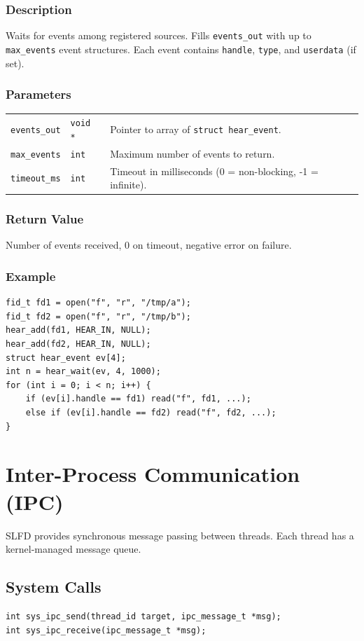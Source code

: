 \documentclass[12pt,a4paper]{article}
\begin{document}
\subsubsection{Description}
Waits for events among registered sources. Fills \texttt{events\_out} with up to \texttt{max\_events} event structures. Each event contains \texttt{handle}, \texttt{type}, and \texttt{userdata} (if set).

\subsubsection{Parameters}
\begin{tabularx}{\textwidth}{|l|l|X|}
\hline
\verb|events_out| & \verb|void *| & Pointer to array of \texttt{struct hear\_event}. \\
\verb|max_events| & \verb|int| & Maximum number of events to return. \\
\verb|timeout_ms| & \verb|int| & Timeout in milliseconds (0 = non-blocking, -1 = infinite). \\
\hline
\end{tabularx}

\subsubsection{Return Value}
Number of events received, 0 on timeout, negative error on failure.

\subsubsection{Example}
\begin{lstlisting}
fid_t fd1 = open("f", "r", "/tmp/a");
fid_t fd2 = open("f", "r", "/tmp/b");
hear_add(fd1, HEAR_IN, NULL);
hear_add(fd2, HEAR_IN, NULL);
struct hear_event ev[4];
int n = hear_wait(ev, 4, 1000);
for (int i = 0; i < n; i++) {
    if (ev[i].handle == fd1) read("f", fd1, ...);
    else if (ev[i].handle == fd2) read("f", fd2, ...);
}
\end{lstlisting}
\section{Inter-Process Communication (IPC)}

SLFD provides synchronous message passing between threads. Each thread has a kernel‑managed message queue.

\subsection{System Calls}
\begin{lstlisting}
int sys_ipc_send(thread_id target, ipc_message_t *msg);
int sys_ipc_receive(ipc_message_t *msg);
\end{lstlisting}
\end{document}
